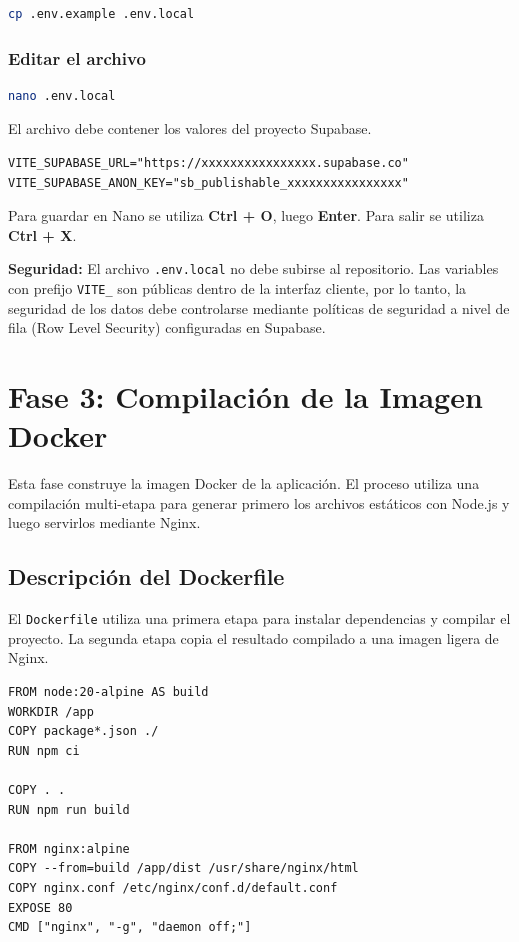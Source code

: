 \documentclass[12pt,letterpaper]{article}
\newcommand{\code}[1]{\nolinkurl{#1}}
\begin{document}
\begin{lstlisting}[language=bash]
cp .env.example .env.local
\end{lstlisting}

\subsubsection*{Editar el archivo}

\begin{lstlisting}[language=bash]
nano .env.local
\end{lstlisting}

El archivo debe contener los valores del proyecto Supabase.

\begin{lstlisting}[language={}]
VITE_SUPABASE_URL="https://xxxxxxxxxxxxxxxx.supabase.co"
VITE_SUPABASE_ANON_KEY="sb_publishable_xxxxxxxxxxxxxxxx"
\end{lstlisting}

Para guardar en Nano se utiliza \textbf{Ctrl + O}, luego \textbf{Enter}. Para salir se utiliza \textbf{Ctrl + X}.

\textbf{Seguridad:} El archivo \code{.env.local} no debe subirse al repositorio. Las variables con prefijo \code{VITE_} son públicas dentro de la interfaz cliente, por lo tanto, la seguridad de los datos debe controlarse mediante políticas de seguridad a nivel de fila (Row Level Security) configuradas en Supabase.

\section{Fase 3: Compilación de la Imagen Docker}

Esta fase construye la imagen Docker de la aplicación. El proceso utiliza una compilación multi-etapa para generar primero los archivos estáticos con Node.js y luego servirlos mediante Nginx.

\subsection{Descripción del Dockerfile}

El \code{Dockerfile} utiliza una primera etapa para instalar dependencias y compilar el proyecto. La segunda etapa copia el resultado compilado a una imagen ligera de Nginx.

\begin{lstlisting}[language={}]
FROM node:20-alpine AS build
WORKDIR /app
COPY package*.json ./
RUN npm ci

COPY . .
RUN npm run build

FROM nginx:alpine
COPY --from=build /app/dist /usr/share/nginx/html
COPY nginx.conf /etc/nginx/conf.d/default.conf
EXPOSE 80
CMD ["nginx", "-g", "daemon off;"]
\end{lstlisting}
\end{document}
